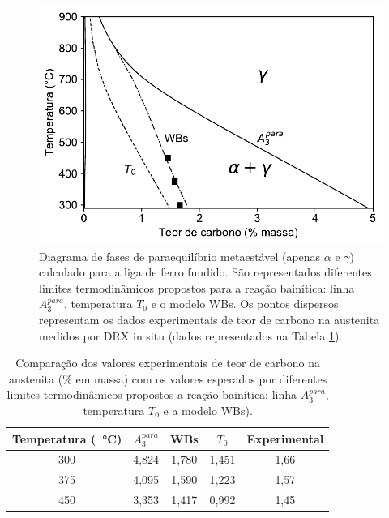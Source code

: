 \begin{figure}
  \centering  
  \includegraphics[width=.8\textwidth]{img/thermo-calc/WBs_para.pdf}
  \caption{Diagrama de fases de paraequilíbrio metaestável (apenas $\alpha$ e $\gamma$) calculado para a liga de ferro fundido. São representados diferentes limites termodinâmicos propostos para a reação bainítica: linha $A_3^{para}$, temperatura $T_0$ e o modelo WBs. Os pontos dispersos representam os dados experimentais de teor de carbono na austenita medidos por DRX in situ (dados representados na Tabela \ref{tab:WBs_para}).}
  \label{fig:WBs_para}
\end{figure}

\begin{table}
  \centering
  \caption{Comparação dos valores experimentais de teor de carbono na austenita (\% em massa) com os valores esperados por diferentes limites termodinâmicos propostos a reação bainítica: linha $A_3^{para}$, temperatura $T_0$ e a modelo WBs).}
  \begin{tabular}{ccccc}
    \hline
      Temperatura (\SI{}{\degreeCelsius}) & $A_3^{para}$ & WBs & $T_0$ & Experimental \\
    \hline
      300 & 4,824 & 1,780 & 1,451 & 1,66 \\
      375 & 4,095 & 1,590 & 1,223 & 1,57 \\
      450 & 3,353 & 1,417 & 0,992 & 1,45 \\
    \hline
  \end{tabular}
  \label{tab:WBs_para}
\end{table}


